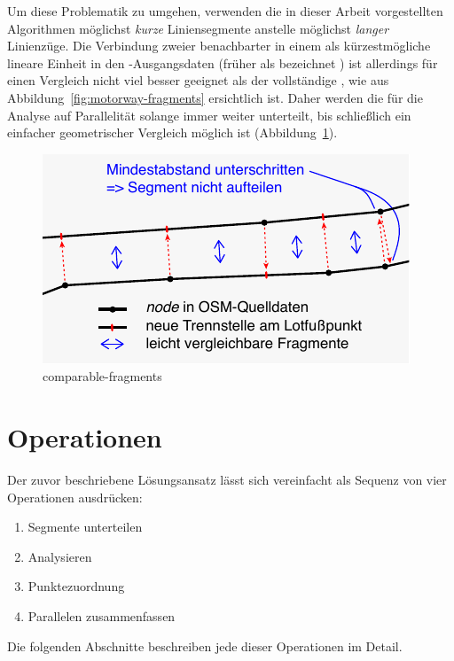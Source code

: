 \documentclass[../main/thesis.tex]{subfiles}
\begin{document}
Um diese Problematik zu umgehen, verwenden die in dieser Arbeit vorgestellten Algorithmen möglichst \emph{kurze} Liniensegmente anstelle möglichst \emph{langer} Linienzüge.
Die Verbindung zweier benachbarter  in einem  als kürzestmögliche lineare Einheit in den \osm-Ausgangsdaten (früher als  bezeichnet ) ist allerdings für einen Vergleich nicht viel besser geeignet als der vollständige %
, wie aus Abbildung~\ref{fig:motorway-fragments} ersichtlich ist.
Daher werden die  für die Analyse auf Parallelität solange immer weiter unterteilt, bis schließlich ein einfacher geometrischer Vergleich möglich ist (Abbildung~\ref{fig:comparable-fragments}).

\begin{figure}[ht]
    \centering
    \includegraphics[width=\ScaleIfNeeded]{../chapter4/comparable-fragments}
    \caption{comparable-fragments}\label{fig:comparable-fragments}
\end{figure}



\section{Operationen}

Der zuvor beschriebene Lösungsansatz lässt sich vereinfacht als Sequenz von vier Operationen ausdrücken:
\begin{enumerate}[nosep]
	\item Segmente unterteilen
	\item Analysieren
	\item Punktezuordnung
	\item Parallelen zusammenfassen
\end{enumerate}
%
%
Die folgenden Abschnitte beschreiben jede dieser Operationen im Detail.
\end{document}
